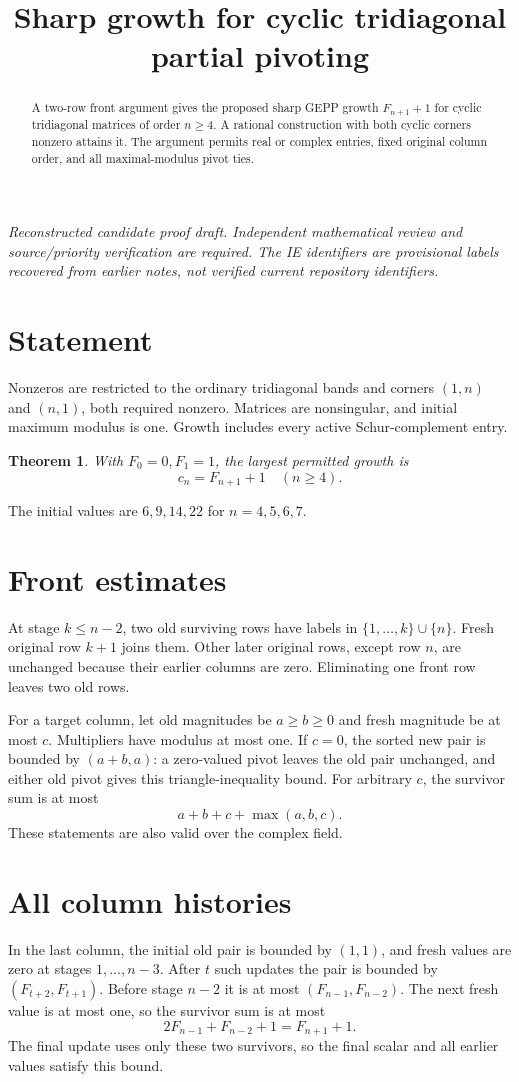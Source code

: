 \documentclass[11pt]{article}
\title{Sharp growth for cyclic tridiagonal partial pivoting}
\author{}
\date{}
\newtheorem{theorem}{Theorem}
\begin{document}
\maketitle
\noindent\textit{Reconstructed candidate proof draft. Independent mathematical review and source/priority verification are required. The IE identifiers are provisional labels recovered from earlier notes, not verified current repository identifiers.}


\begin{abstract}
A two-row front argument gives the proposed sharp GEPP growth $F_{n+1}+1$ for cyclic tridiagonal matrices of order $n\ge4$. A rational construction with both cyclic corners nonzero attains it. The argument permits real or complex entries, fixed original column order, and all maximal-modulus pivot ties.
\end{abstract}
\section{Statement}
Nonzeros are restricted to the ordinary tridiagonal bands and corners $(1,n)$ and $(n,1)$, both required nonzero. Matrices are nonsingular, and initial maximum modulus is one. Growth includes every active Schur-complement entry.
\begin{theorem}
With $F_0=0,F_1=1$, the largest permitted growth is
\[\boxed{c_n=F_{n+1}+1\quad(n\ge4).}\]
\end{theorem}
The initial values are $6,9,14,22$ for $n=4,5,6,7$.
\section{Front estimates}
At stage $k\le n-2$, two old surviving rows have labels in $\{1,\ldots,k\}\cup\{n\}$. Fresh original row $k+1$ joins them. Other later original rows, except row $n$, are unchanged because their earlier columns are zero. Eliminating one front row leaves two old rows.

For a target column, let old magnitudes be $a\ge b\ge0$ and fresh magnitude be at most $c$. Multipliers have modulus at most one. If $c=0$, the sorted new pair is bounded by $(a+b,a)$: a zero-valued pivot leaves the old pair unchanged, and either old pivot gives this triangle-inequality bound. For arbitrary $c$, the survivor sum is at most
\[a+b+c+\max(a,b,c).\]
These statements are also valid over the complex field.
\section{All column histories}
In the last column, the initial old pair is bounded by $(1,1)$, and fresh values are zero at stages $1,\ldots,n-3$. After $t$ such updates the pair is bounded by $(F_{t+2},F_{t+1})$. Before stage $n-2$ it is at most $(F_{n-1},F_{n-2})$. The next fresh value is at most one, so the survivor sum is at most
\[2F_{n-1}+F_{n-2}+1=F_{n+1}+1.\]
The final update uses only these two survivors, so the final scalar and all earlier values satisfy this bound.
\end{document}
